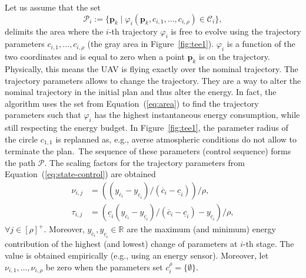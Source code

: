 \documentclass[letterpaper,10pt,conference]{ieeeconf}
\theoremstyle{definition}
\begin{document}
Let us assume that the set
\begin{equation}\label{eq:area}
  \mathcal{P}_i:=\{\mathbf{p}_k\mid\varphi_i(\mathbf{p}_k,c_{i,1},\dots,c_{i,\rho})\in\mathcal{C}_i\},
\end{equation}
delimits the area where the $i$-th trajectory $\varphi_i$ is free to evolve using the trajectory parameters $c_{i,1},...,c_{i,\rho}$ (the gray area in Figure~\ref{fig:tee1}). $\varphi_i$ is a function of the two coordinates and is equal to zero when a point $\mathbf{p}_k$ is on the trajectory. Physically, this means the UAV is flying exactly over the nominal trajectory. The trajectory parameters allows to change the trajectory. They are a way to alter the nominal trajectory in the initial plan and thus alter the energy.
In fact, the algorithm uses the set from Equation~(\ref{eq:area}) to find the trajectory parameters such that $\varphi_i$ has the highest instantaneous energy consumption, while still respecting the energy budget. In Figure~\ref{fig:tee1}, the parameter radius of the circle $c_{1,1}$ is replanned as, e.g., averse atmospheric conditions do not allow to terminate the plan. The sequence of these parameters (control sequence) forms the path $\mathcal{P}$. The scaling factors for the trajectory parameters from Equation~(\ref{eq:state-control}) are obtained
\begin{equation}\label{eq:traj-gains}\begin{split}
  \nu_{i,j}&=\left((y_{\overline{c}_i}-y_{\underline{c}_i})/(\overline{c}_i-\underline{c}_i)\right)/\rho,\\
  \tau_{i,j}&=\left(\underline{c}_i(y_{\overline{c}_i}-y_{\underline{c}_i})/(\overline{c}_i-\underline{c}_i)-y_{\underline{c}_i}\right)/\rho,
\end{split}\end{equation}
$\forall j\in[\rho]^+$. Moreover, $y_{\overline{c}_i},y_{\underline{c}_i}\in\mathbb{R}$ are the maximum (and minimum) energy contribution of the highest (and lowest) change of parameters at $i$-th stage. The value is obtained empirically (e.g., using an energy sensor). 
Moreover, let $\nu_{i,1},\dots,\nu_{i,\rho}$ be zero when the parameters set $c_i^\rho=\{\emptyset\}$.
\end{document}
